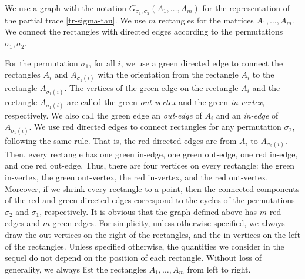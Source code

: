 \documentclass[10pt,a4paper]{amsart}
\numberwithin{equation}{section}
\theoremstyle{plain}
\begin{document}
We use a graph with the notation $G_{\sigma_1,\sigma_2} (A_1,\ldots,A_m)$ for the representation of the partial trace \eqref{tr-sigma-tau}. We use $m$ rectangles for the matrices $A_1,\ldots,A_m$. We connect the rectangles with directed edges according to the permutations $\sigma_1, \sigma_2$.

For the permutation $\sigma_1$, for all $i$, we use a green directed edge to connect the rectangles $A_i$ and $A_{\sigma_1(i)}$ with the orientation from the rectangle $A_i$ to the rectangle $A_{\sigma_1(i)}$. The vertices of the green edge on the rectangle $A_i$ and the rectangle $A_{\sigma_1(i)}$ are called the green \textit{out-vertex} and the green \textit{in-vertex}, respectively. We also call the green edge an \textit{out-edge} of $A_i$ and an \textit{in-edge} of $A_{\sigma_1(i)}$.
We use red directed edges to connect rectangles for any permutation $\sigma_2$, following the same rule.
That is, the red directed edges are from $A_i$ to $A_{\sigma_2(i)}$.
Then, every rectangle has one green in-edge, one green out-edge, one red in-edge, and one red out-edge. Thus, there are four vertices on every rectangle: the green in-vertex, the green out-vertex, the red in-vertex, and the red out-vertex.
Moreover, if we shrink every rectangle to a point, then the connected components of the red and green directed edges correspond to the cycles of the permutations $\sigma_2$ and $\sigma_1$, respectively.
It is obvious that the graph defined above has $m$ red edges and $m$ green edges.
For simplicity, unless otherwise specified, we always draw the out-vertices on the right of the rectangles, and the in-vertices on the left of the rectangles. Unless specified otherwise, the quantities we consider in the sequel do not depend on the position of each rectangle. Without loss of generality, we always list the rectangles $A_1,\ldots,A_m$ from left to right.
\end{document}
